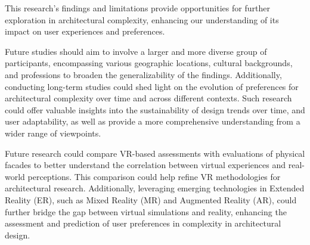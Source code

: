 


This research's findings and limitations provide opportunities for further exploration in architectural complexity, enhancing our understanding of its impact on user experiences and preferences.


Future studies should aim to involve a larger and more diverse group of participants, encompassing various geographic locations, cultural backgrounds, and professions to broaden the generalizability of the findings.
Additionally, conducting long-term studies could shed light on the evolution of preferences for architectural complexity over time and across different contexts.
Such research could offer valuable insights into the sustainability of design trends over time, and user adaptability, as well as provide a more comprehensive understanding from a wider range of viewpoints.


Future research could compare VR-based assessments with evaluations of physical facades to better understand the correlation between virtual experiences and real-world perceptions.
This comparison could help refine VR methodologies for architectural research.
Additionally, leveraging emerging technologies in Extended Reality (ER), such as Mixed Reality (MR) and Augmented Reality (AR), could further bridge the gap between virtual simulations and reality, enhancing the assessment and prediction of user preferences in complexity in architectural design.



